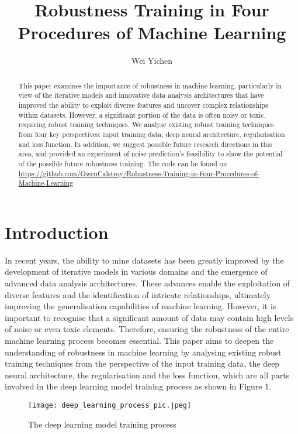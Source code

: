 \documentclass{article}
\title{Robustness Training in Four Procedures of Machine Learning}
\author{Wei Yichen}
\begin{document}
\maketitle

\begin{abstract}
This paper examines the importance of robustness in machine learning, particularly in view of the iterative models and innovative data analysis architectures that have improved the ability to exploit diverse features and uncover complex relationships within datasets. However, a significant portion of the data is often noisy or toxic, requiring robust training techniques. We analyse existing robust training techniques from four key perspectives: input training data, deep neural architecture, regularisation and loss function. In addition, we suggest possible future research directions in this area, and provided an experiment of noise prediction's feasibility to show the potential of the possible future robustness training. The code can be found on \url{https://github.com/OwenCalstroy/Robustness-Training-in-Four-Procedures-of-Machine-Learning}
\end{abstract}

\section{Introduction}

In recent years, the ability to mine datasets has been greatly improved by the development of iterative models in various domains and the emergence of advanced data analysis architectures. These advances enable the exploitation of diverse features and the identification of intricate relationships, ultimately improving the generalisation capabilities of machine learning. However, it is important to recognise that a significant amount of data may contain high levels of noise or even toxic elements. Therefore, ensuring the robustness of the entire machine learning process becomes essential. This paper aims to deepen the understanding of robustness in machine learning by analysing existing robust training techniques from the perspective of the input training data, the deep neural architecture, the regularisation and the loss function, which are all parts involved in the deep learning model training process as shown in Figure 1.

\begin{figure}
\centering
\texttt{[image: deep\_learning\_process\_pic.jpeg]}
\caption{\label{figure 1:}The deep learning model training process}
\end{figure}
\end{document}
